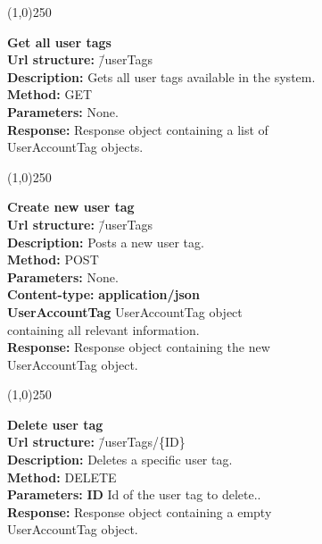 \documentclass[11pt]{article}
\begin{document}
\begin{center}\line(1,0){250}\end{center}

\begin{tabbing}
\textbf{Get all user tags} \\
\textcolor{black!60}{\textbf{Url structure:}} \hspace{0.2in} \= /userTags \\
\textcolor{black!60}{\textbf{Description:}}  \> Gets all user tags available in the system. \\
\textcolor{black!60}{\textbf{Method:}} \> GET \\
\textcolor{black!60}{\textbf{Parameters:}} \> None. \\
\textcolor{black!60}{\textbf{Response:}} \> Response object containing a list of 
\\ \> UserAccountTag objects.
\end{tabbing}

\begin{center}\line(1,0){250}\end{center}

\begin{tabbing}
\textbf{Create new user tag} \\
\textcolor{black!60}{\textbf{Url structure:}} \hspace{0.2in} \= /userTags \\
\textcolor{black!60}{\textbf{Description:}}  \> Posts a new user tag. \\
\textcolor{black!60}{\textbf{Method:}} \> POST \\
\textcolor{black!60}{\textbf{Parameters:}} \> None. \\
\textcolor{black!60}{\textbf{Content-type:}} \> \textbf{application/json} \\
\> \textbf{UserAccountTag} UserAccountTag object 
\\ \> containing all relevant information. \\
\textcolor{black!60}{\textbf{Response:}} \> Response object containing the new 
\\ \> UserAccountTag object.
\end{tabbing}

\begin{center}\line(1,0){250}\end{center}

\begin{tabbing}
\textbf{Delete user tag} \\
\textcolor{black!60}{\textbf{Url structure:}} \hspace{0.2in} \= /userTags/\{ID\} \\
\textcolor{black!60}{\textbf{Description:}}  \> Deletes a specific user tag. \\
\textcolor{black!60}{\textbf{Method:}} \> DELETE \\
\textcolor{black!60}{\textbf{Parameters:}} \> \textbf{ID} Id of the user tag to delete.. \\
\textcolor{black!60}{\textbf{Response:}} \> Response object containing a empty 
\\ \> UserAccountTag object.
\end{tabbing}
\end{document}
